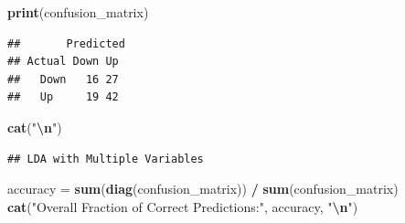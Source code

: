 \documentclass[
]{article}
\newenvironment{Shaded}{\begin{snugshade}}{\end{snugshade}}
\newcommand{\AttributeTok}[1]{\textcolor[rgb]{0.13,0.29,0.53}{#1}}
\newcommand{\CommentTok}[1]{\textcolor[rgb]{0.56,0.35,0.01}{\textit{#1}}}
\newcommand{\FunctionTok}[1]{\textcolor[rgb]{0.13,0.29,0.53}{\textbf{#1}}}
\newcommand{\NormalTok}[1]{#1}
\newcommand{\OtherTok}[1]{\textcolor[rgb]{0.56,0.35,0.01}{#1}}
\newcommand{\SpecialCharTok}[1]{\textcolor[rgb]{0.81,0.36,0.00}{\textbf{#1}}}
\newcommand{\StringTok}[1]{\textcolor[rgb]{0.31,0.60,0.02}{#1}}
\begin{document}
\begin{Shaded}
\begin{Highlighting}[]
\FunctionTok{print}\NormalTok{(confusion\_matrix)}
\end{Highlighting}
\end{Shaded}

\begin{verbatim}
##       Predicted
## Actual Down Up
##   Down   16 27
##   Up     19 42
\end{verbatim}

\begin{Shaded}
\begin{Highlighting}[]
\FunctionTok{cat}\NormalTok{(}\StringTok{"}\SpecialCharTok{\textbackslash{}n}\StringTok{"}\NormalTok{)}
\end{Highlighting}
\end{Shaded}

\begin{Shaded}
\end{Shaded}

\begin{verbatim}
## LDA with Multiple Variables
\end{verbatim}

\begin{Shaded}
\begin{Highlighting}[]
\NormalTok{accuracy }\OtherTok{=} \FunctionTok{sum}\NormalTok{(}\FunctionTok{diag}\NormalTok{(confusion\_matrix)) }\SpecialCharTok{/} \FunctionTok{sum}\NormalTok{(confusion\_matrix)}
\FunctionTok{cat}\NormalTok{(}\StringTok{"Overall Fraction of Correct Predictions:"}\NormalTok{, accuracy, }\StringTok{"}\SpecialCharTok{\textbackslash{}n}\StringTok{"}\NormalTok{)}
\end{Highlighting}
\end{Shaded}
\end{document}
